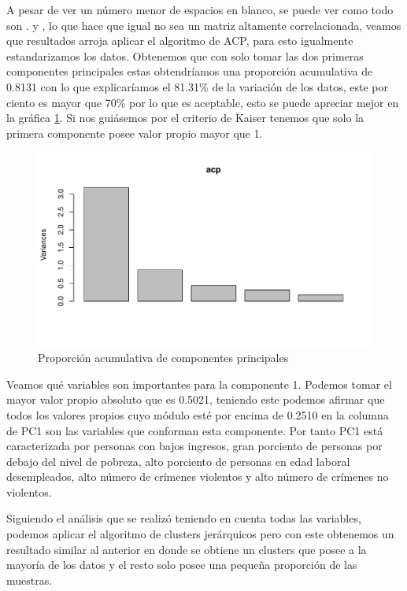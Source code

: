\documentclass[a4paper,10pt,twocolumn]{article}
\begin{document}
	A pesar de ver un número menor de espacios en blanco, se puede ver como todo son . y , lo que hace que igual no sea un matriz altamente correlacionada, veamos que resultados arroja aplicar el algoritmo de ACP, para esto igualmente estandarizamos los datos. Obtenemos que con solo tomar las dos primeras componentes principales estas obtendríamos una proporción acumulativa de 0.8131 con lo que explicaríamos el 81.31\% de la variación de los datos, este por ciento es mayor que 70\% por lo que es aceptable, esto se puede apreciar mejor en la gráfica \ref{fig:acp_2}. Si nos guiásemos por el criterio de Kaiser tenemos que solo la primera componente posee valor propio mayor que 1.

	\begin{figure}[htb]
		\begin{center}
			\includegraphics[width=\columnwidth]{figures/acp_2.pdf}
		\end{center}
		\caption{Proporción acumulativa de componentes principales\label{fig:acp_2}}%
	\end{figure}

	Veamos qué variables son importantes para la componente 1. Podemos tomar el mayor valor propio absoluto que es 0.5021, teniendo este podemos afirmar que todos los valores propios cuyo módulo esté por encima de 0.2510 en la columna de PC1 son las variables que conforman esta componente. Por tanto PC1 está caracterizada por personas con bajos ingresos, gran porciento de personas por debajo del nivel de pobreza, alto porciento de personas en edad laboral desempleados, alto número de crímenes violentos y alto número de crímenes no violentos.

	Siguiendo el análisis que se realizó teniendo en cuenta todas las variables, podemos aplicar el algoritmo de clusters jerárquicos pero con este obtenemos un resultado similar al anterior en donde se obtiene un clusters que posee a la mayoría de los datos y el resto solo posee una pequeña proporción de las muestras.
\end{document}
